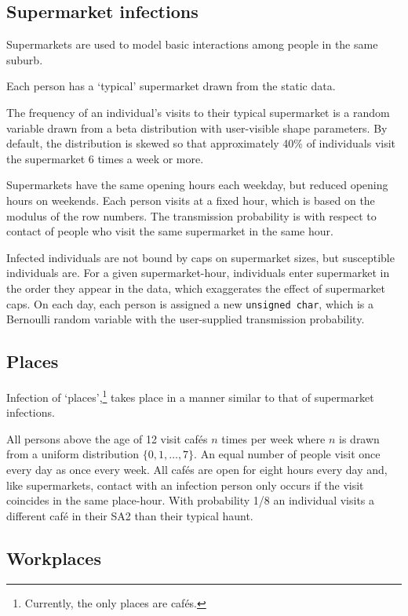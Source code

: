 \documentclass{grattan}
\newcommand*{\code}[1]{\texttt{#1}}
\begin{document}
\subsection{Supermarket infections}

Supermarkets are used to model basic interactions among people in the same suburb.

Each person has a `typical' supermarket drawn from the static data.

The frequency of an individual's visits to their typical supermarket is a random variable
drawn from a beta distribution with user-visible shape parameters. By default, the distribution
is skewed so that approximately 40\% of individuals visit the supermarket 6 times a week or
more.

Supermarkets have the same opening hours each weekday, but reduced opening hours on weekends.
Each person visits at a fixed hour, which is based on the modulus of the row numbers. The transmission
probability is with respect to contact of people who visit the same supermarket in the same hour.

Infected individuals are not bound by caps on supermarket sizes, but susceptible individuals are.
For a given supermarket-hour, individuals enter supermarket in the order they appear in the data,
which exaggerates the effect of supermarket caps. On each day, each person is assigned a
new \code{unsigned char}, which is a Bernoulli random variable with the user-supplied
transmission probability.

\subsection{Places}

Infection of `places',\footnote{Currently, the only places are caf\'{e}s.}
takes place in a manner similar to that of supermarket infections.

All persons above the age of 12 visit caf\'es \(n\)
times per week where \(n\) is drawn from a
uniform distribution \(\{0, 1, \dots, 7\}\). An equal number of people
visit once every day as once every week. All caf\'es are open for eight
hours every day and, like supermarkets, contact with an infection person
only occurs if the visit coincides in the same place-hour. With probability
1/8 an individual visits a different caf\'e in their SA2 than their typical
haunt.

\subsection{Workplaces}
\end{document}
